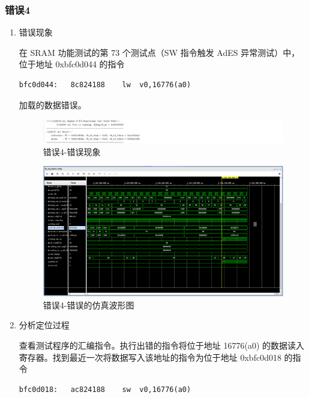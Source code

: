 \subsubsection{错误4}

\begin{enumerate}[(1)]
    \item 错误现象

在 SRAM 功能测试的第 73 个测试点（SW 指令触发 AdES 异常测试）中，位于地址 0xbfc0d044 的指令

\begin{lstlisting}
bfc0d044:	8c824188 	lw	v0,16776(a0)
\end{lstlisting}

加载的数据错误。

\begin{figure}[H]
    \centering
    \includegraphics[width=\textwidth]{image/错误4-错误现象1.png}
    \caption{错误4-错误现象}
    \label{fig:错误4-错误现象1}
\end{figure}

\begin{figure}[H]
    \centering
    \includegraphics[width=\textwidth]{image/错误4-错误现象2.png}
    \caption{错误4-错误的仿真波形图}
    \label{fig:错误4-错误现象2}
\end{figure}

    \item 分析定位过程

查看测试程序的汇编指令。执行出错的指令将位于地址 16776(a0) 的数据读入寄存器。找到最近一次将数据写入该地址的指令为位于地址 0xbfc0d018 的指令

\begin{lstlisting}
bfc0d018:	ac824188 	sw	v0,16776(a0)
\end{lstlisting}


\end{enumerate}
